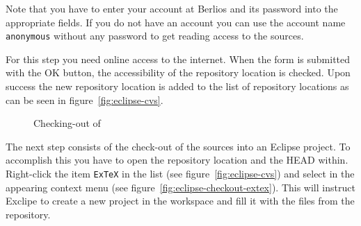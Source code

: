 Note that you have to enter your account at Berlios and its password
into the appropriate fields. If you do not have an account you can use
the account name \texttt{anonymous} without any password to get
reading access to the sources.

For this step you need online access to the internet. When the form is
submitted with the OK button, the accessibility of the repository
location is checked. Upon success the new repository location is
added to the list of repository locations as can be seen in
figure~\ref{fig:eclipse-cvs}.
\begin{figure}[htbp]
  \hbox{}\hfill
  \hfill
  \caption{Checking-out of \ExTeX}
\end{figure}

The next step consists of the check-out of the sources into an Eclipse
project. To accomplish this you have to open the repository location
and the HEAD within. Right-click the item \texttt{ExTeX} in the list
(see figure~\ref{fig:eclipse-cvs}) and select  in the
appearing context menu (see figure~\ref{fig:eclipse-checkout-extex}).
This will instruct Exclipe to create a new project in the workspace
and fill it with the files from the repository.

